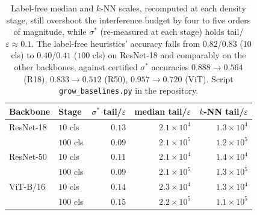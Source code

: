 \documentclass[10pt,twocolumn]{article}
\newcommand{\sstar}{\sigma^{*}}
\begin{document}
\begin{table}[H]
\centering
\small
\begin{tabular}{llrrr}
\toprule
Backbone & Stage & $\sstar$ tail/$\varepsilon$ & median tail/$\varepsilon$ & $k$-NN tail/$\varepsilon$ \\
\midrule
ResNet-18  & $10$ cls  & $0.13$ & $2.1\times10^4$ & $1.3\times10^4$ \\
           & $100$ cls & $0.09$ & $2.1\times10^5$ & $1.2\times10^5$ \\
\midrule
ResNet-50  & $10$ cls  & $0.11$ & $2.1\times10^4$ & $1.4\times10^4$ \\
           & $100$ cls & $0.09$ & $2.1\times10^5$ & $1.3\times10^5$ \\
\midrule
ViT-B/16   & $10$ cls  & $0.14$ & $2.3\times10^4$ & $1.3\times10^4$ \\
           & $100$ cls & $0.15$ & $2.2\times10^5$ & $1.1\times10^5$ \\
\bottomrule
\end{tabular}
\caption{Label-free median and $k$-NN scales, recomputed at each density stage, still overshoot the interference budget by four to five orders of magnitude, while $\sstar$ (re-measured at each stage) holds tail/$\varepsilon\approx0.1$. The label-free heuristics' accuracy falls from $0.82$/$0.83$ ($10$ cls) to $0.40$/$0.41$ ($100$ cls) on ResNet-18 and comparably on the other backbones, against certified $\sstar$ accuracies $0.888\to0.564$ (R18), $0.833\to0.512$ (R50), $0.957\to0.720$ (ViT). Script \texttt{grow\_baselines.py} in the repository.}
\label{tab:growbaselines}
\end{table}
\end{document}
